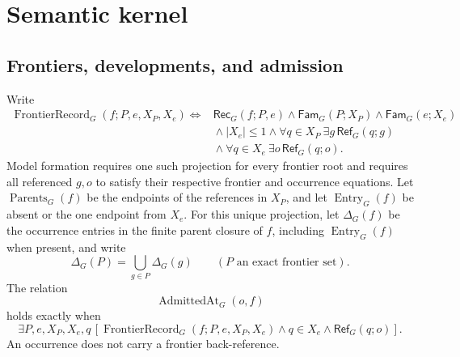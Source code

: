 \documentclass[11pt,twoside]{article}
\newcommand{\Rec}{\mathsf{Rec}}
\newcommand{\Fam}{\mathsf{Fam}}
\newcommand{\RefPos}{\mathsf{Ref}}
\begin{document}
\section{Semantic kernel}\label{sec:kernel}

\subsection{Frontiers, developments, and admission}

Write
\[
\begin{split}
 \operatorname{FrontierRecord}_G(f;P,e,X_P,X_e)
 \Longleftrightarrow{}&\Rec_G(f;P,e)\land\Fam_G(P;X_P)
                  \land\Fam_G(e;X_e)\\
 &{}\land |X_e|\le1
 \land\forall q\in X_P\ \exists g\,\RefPos_G(q;g)\\
 &{}\land\forall q\in X_e\ \exists o\,\RefPos_G(q;o).
\end{split}
\]
Model formation requires one such projection for every frontier root and requires
all referenced \(g,o\) to satisfy their respective frontier and occurrence
equations.  Let \(\operatorname{Parents}_G(f)\) be the endpoints of the references
in \(X_P\), and let \(\operatorname{Entry}_G(f)\) be absent or the one endpoint
from \(X_e\).  For this unique projection, let \(\Delta_G(f)\) be the occurrence
entries in the finite parent closure of \(f\), including
\(\operatorname{Entry}_G(f)\) when present, and write
\[
  \Delta_G(P)=\bigcup_{g\in P}\Delta_G(g)
  \qquad(P\text{ an exact frontier set}).
\]
The relation
\[
  \operatorname{AdmittedAt}_G(o,f)
\]
holds exactly when
\[
 \exists P,e,X_P,X_e,q\,[
 \operatorname{FrontierRecord}_G(f;P,e,X_P,X_e)
 \land q\in X_e\land\RefPos_G(q;o)].
\]
An occurrence does
not carry a frontier back-reference.
\end{document}
